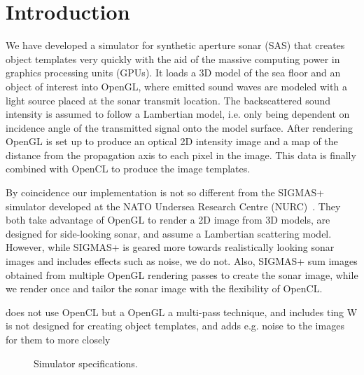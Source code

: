 \documentclass[
   UAM                                          %
 , 12pt                                         %
 , bibtex                                       %
 , layout
]{common/mytemplate}
\begin{document}
\section{Introduction}




We have developed a simulator for synthetic aperture sonar (SAS) that creates object templates very quickly with the aid of the massive computing power in graphics processing units (GPUs). It loads a 3D model of the sea floor and an object of interest into OpenGL, where emitted sound waves are modeled with a light source placed at the sonar transmit location. The backscattered sound intensity is assumed to follow a Lambertian model, i.e. only being dependent on incidence angle of the transmitted signal onto the model surface. After rendering OpenGL is set up to produce an optical 2D intensity image and a map of the distance from the propagation axis to each pixel in the image. This data is finally combined with OpenCL to produce the image templates.

By coincidence our implementation is not so different from the SIGMAS+ simulator developed at the NATO Undersea Research Centre (NURC)~\cite{Coiras2009a, Coiras2009b}. They both take advantage of OpenGL to render a 2D image from 3D models, are designed for side-looking sonar, and assume a Lambertian scattering model. However, while SIGMAS+ is geared more towards realistically looking sonar images and includes effects such as noise, we do not. Also, SIGMAS+ sum images obtained from multiple OpenGL rendering passes to create the sonar image, while we render once and tailor the sonar image with the flexibility of OpenCL. 

does not use OpenCL but a OpenGL a multi-pass technique, and includes ting  W
is not designed for creating object templates, and adds e.g. noise to the images for them to more closely  

\begin{figure}[t]\centering%
%
\caption{Simulator specifications.}\label{specs}%
\end{figure}
\end{document}
